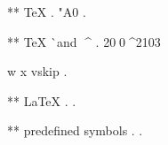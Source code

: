 ** TeX \char
.
 \char"A0
.


** TeX ^^ and ^^^^
.
20^^A0^^^^2103

^^7 ^^78 vs^^+ip
.


** LaTeX \symbol{}
.
.


** predefined symbols
.
\textellipsis
.
